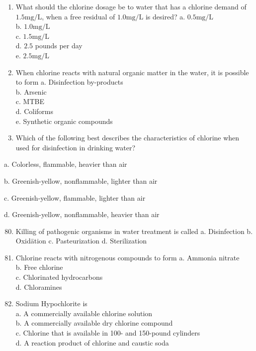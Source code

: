 \documentclass[10pt]{article}
\begin{document}
\begin{enumerate}
\begin{enumerate}
\begin{enumerate}
  \item What should the chlorine dosage be to water that has a chlorine demand of $1.5 \mathrm{mg} / \mathrm{L}$, when a free residual of $1.0 \mathrm{mg} / \mathrm{L}$ is desired?
a. $0.5 \mathrm{mg} / \mathrm{L}$\\
b. $1.0 \mathrm{mg} / \mathrm{L}$\\
c. $1.5 \mathrm{mg} / \mathrm{L}$\\
d. $2.5$ pounds per day\\
e. $2.5 \mathrm{mg} / \mathrm{L}$

  \item When chlorine reacts with natural organic matter in the water, it is possible to form a. Disinfection by-products\\
b. Arsenic\\
c. MTBE\\
d. Coliforms\\
e. Synthetic organic compounds

  \item Which of the following best describes the characteristics of chlorine when used for disinfection in drinking water?

\end{enumerate}

a. Colorless, flammable, heavier than air

b. Greenish-yellow, nonflammable, lighter than air

c. Greenish-yellow, flammable, lighter than air

d. Greenish-yellow, nonflammable, heavier than air

\begin{enumerate}
  \setcounter{enumi}{79}
  \item Killing of pathogenic organisms in water treatment is called
a. Disinfection
b. Oxidätion
c. Pasteurization
d. Sterilization

  \item Chlorine reacts with nitrogenous compounds to form
a. Ammonia nitrate\\
b. Free chlorine\\
c. Chlorinated hydrocarbons\\
d. Chloramines

  \item Sodium Hypochlorite is\\
a. A commercially available chlorine solution\\
b. A commercially available dry chlorine compound\\
c. Chlorine that is available in 100- and 150-pound cylinders\\
d. A reaction product of chlorine and caustic soda


\end{enumerate}
\end{enumerate}
\end{enumerate}
\end{document}
